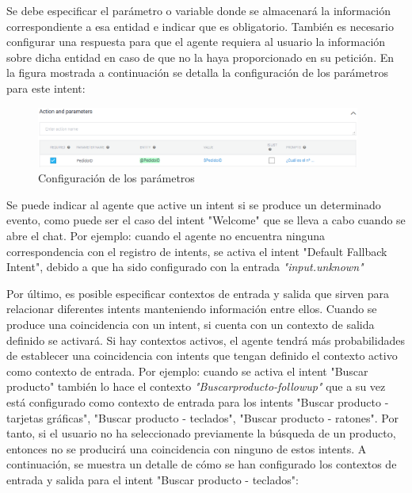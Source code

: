 Se debe especificar el parámetro o variable donde se almacenará la información correspondiente a esa entidad e indicar que es obligatorio. También es necesario configurar una respuesta para que el agente requiera al usuario la información sobre dicha entidad en caso de que no la haya proporcionado en su petición. En la figura mostrada a continuación se detalla la configuración de los parámetros para este intent:

\begin{figure}[ht]
	\begin{center}
		\includegraphics[width = 0.95\textwidth]{Figuras/parametersOrderID.PNG}
	\end{center}
	\caption{\label{fig:parametros} Configuración de los parámetros}
\end{figure}

Se puede indicar al agente que active un intent si se produce un determinado evento, como puede ser el caso del intent "Welcome" que se lleva a cabo cuando se abre el chat. Por ejemplo: cuando el agente no encuentra ninguna correspondencia con el registro de intents, se activa el intent "Default Fallback Intent", debido a que ha sido configurado con la entrada \textit{"input.unknown"}


Por último, es posible especificar contextos de entrada y salida que sirven para relacionar diferentes intents manteniendo información entre ellos. Cuando se produce una coincidencia con un intent, si cuenta con un contexto de salida definido se activará. Si hay contextos activos, el agente tendrá más probabilidades de establecer una coincidencia con intents que tengan definido el contexto activo como contexto de entrada. Por ejemplo: cuando se activa el intent "Buscar producto" también lo hace el contexto \textit{"Buscarproducto-followup"} que a su vez está configurado como contexto de entrada para los intents "Buscar producto - tarjetas gráficas", "Buscar producto - teclados", "Buscar producto - ratones". Por tanto, si el usuario no ha seleccionado previamente la búsqueda de un producto, entonces no se producirá una coincidencia con ninguno de estos intents. A continuación, se muestra un detalle de cómo se han configurado los contextos de entrada y salida para el intent "Buscar producto - teclados":

